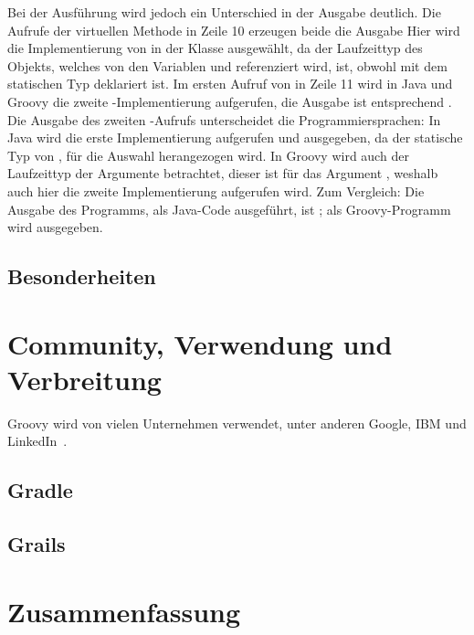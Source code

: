 \documentclass[11pt,a4paper]{article}
\begin{document}
	Bei der Ausführung wird jedoch ein Unterschied in der Ausgabe deutlich.
	Die Aufrufe der virtuellen Methode  in Zeile 10 erzeugen beide die Ausgabe 
	Hier wird die Implementierung von  in der Klasse  ausgewählt, da der Laufzeittyp des Objekts, welches von den Variablen  und  referenziert wird,  ist, obwohl  mit dem statischen Typ  deklariert ist.
	Im ersten Aufruf von  in Zeile 11 wird in Java und Groovy die zweite -Implementierung aufgerufen, die Ausgabe ist entsprechend .
	Die Ausgabe des zweiten -Aufrufs unterscheidet die Programmiersprachen:
	In Java wird die erste Implementierung aufgerufen und  ausgegeben, da der statische Typ von ,  für die Auswahl herangezogen wird.
	In Groovy wird auch der Laufzeittyp der Argumente betrachtet, dieser ist für das Argument  , weshalb auch hier die zweite Implementierung aufgerufen wird.
	Zum Vergleich:
	Die Ausgabe des Programms, als Java-Code ausgeführt, ist ;
	als Groovy-Programm wird  ausgegeben.

	\subsection{Besonderheiten}\label{subsec:besonderheiten}


	\section{Community, Verwendung und Verbreitung}\label{sec:community}

	Groovy wird von vielen Unternehmen verwendet, unter anderen Google, IBM und LinkedIn~\cite{groovy-lang:main,wiki:Groovy}.

	\subsection{Gradle}\label{subsec:gradle}

	\subsection{Grails}\label{subsec:grails}


	\section{Zusammenfassung}\label{sec:zusammenfassung}


	
	

\end{document}
